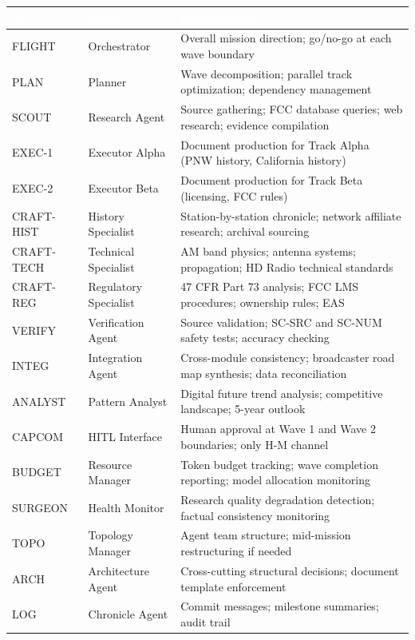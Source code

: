 \documentclass[11pt,letterpaper]{article}
\newcommand{\tableheader}[1]{\textbf{\sffamily\textcolor{white}{#1}}}
\begin{document}
\begin{asciibox}
\begin{center}
\begin{tabularx}{\textwidth}{L{2cm}L{3cm}X}
\toprule
{}
\tableheader{Role} & \tableheader{Agent} & \tableheader{Responsibility} \\
\midrule
FLIGHT & Orchestrator & Overall mission direction; go/no-go at each wave boundary \\
PLAN & Planner & Wave decomposition; parallel track optimization; dependency management \\
SCOUT & Research Agent & Source gathering; FCC database queries; web research; evidence compilation \\
EXEC-1 & Executor Alpha & Document production for Track Alpha (PNW history, California history) \\
EXEC-2 & Executor Beta & Document production for Track Beta (licensing, FCC rules) \\
CRAFT-HIST & History Specialist & Station-by-station chronicle; network affiliate research; archival sourcing \\
CRAFT-TECH & Technical Specialist & AM band physics; antenna systems; propagation; HD Radio technical standards \\
CRAFT-REG & Regulatory Specialist & 47 CFR Part 73 analysis; FCC LMS procedures; ownership rules; EAS \\
VERIFY & Verification Agent & Source validation; SC-SRC and SC-NUM safety tests; accuracy checking \\
INTEG & Integration Agent & Cross-module consistency; broadcaster road map synthesis; data reconciliation \\
ANALYST & Pattern Analyst & Digital future trend analysis; competitive landscape; 5-year outlook \\
CAPCOM & HITL Interface & Human approval at Wave 1 and Wave 2 boundaries; only H-M channel \\
BUDGET & Resource Manager & Token budget tracking; wave completion reporting; model allocation monitoring \\
SURGEON & Health Monitor & Research quality degradation detection; factual consistency monitoring \\
TOPO & Topology Manager & Agent team structure; mid-mission restructuring if needed \\
ARCH & Architecture Agent & Cross-cutting structural decisions; document template enforcement \\
LOG & Chronicle Agent & Commit messages; milestone summaries; audit trail \\
\bottomrule
\end{tabularx}
\end{center}


\end{asciibox}
\end{document}
